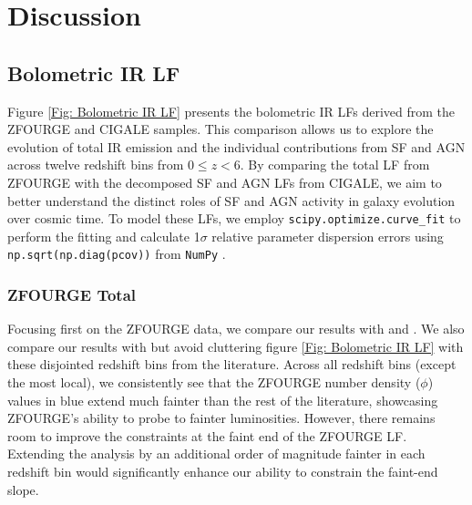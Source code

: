 \section{Discussion} \label{Sec: Discussion}
\subsection{Bolometric IR LF} \label{Sec: Bolometric IR LF}

Figure \ref{Fig: Bolometric IR LF} presents the bolometric IR LFs derived from the ZFOURGE and CIGALE samples. This comparison allows us to explore the evolution of total IR emission and the individual contributions from SF and AGN across twelve redshift bins from $0 \leq z < 6$. By comparing the total LF from ZFOURGE with the decomposed SF and AGN LFs from CIGALE, we aim to better understand the distinct roles of SF and AGN activity in galaxy evolution over cosmic time. To model these LFs, we employ \texttt{scipy.optimize.curve\_fit} \citep{virtanen_scipy_2020} to perform the fitting and calculate 1$\sigma$ relative parameter dispersion errors using \texttt{np.sqrt(np.diag(pcov))} from \texttt{NumPy} \citep{harris_array_2020}. 

\subsubsection{ZFOURGE Total}
Focusing first on the ZFOURGE data, we compare our results with \cite{rodighiero_mid-_2010} and \cite{gruppioni_herschel_2013}. We also compare our results with \cite{fu_decomposing_2010, huang_local_2007, caputi_infrared_2007} but avoid cluttering figure \ref{Fig: Bolometric IR LF} with these disjointed redshift bins from the literature. Across all redshift bins (except the most local), we consistently see that the ZFOURGE number density ($\phi$) values in blue extend much fainter than the rest of the literature, showcasing ZFOURGE's ability to probe to fainter luminosities. However, there remains room to improve the constraints at the faint end of the ZFOURGE LF. Extending the analysis by an additional order of magnitude fainter in each redshift bin would significantly enhance our ability to constrain the faint-end slope.

